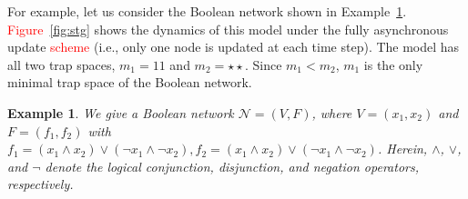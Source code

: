 \documentclass[preprint,12pt]{elsarticle}
\newtheorem{example}{Example}[section]
\newcommand{\change}[1]{\textcolor{red}{#1}}
\begin{document}
For example, let us consider the Boolean network shown in Example~\ref{example:BN}.
\change{Figure~\ref{fig:stg}} shows the dynamics of this model under the fully asynchronous update \change{scheme} (i.e., only one node is updated at each time step).
The model has all two trap spaces, \(m_1 = 11\) and \(m_2 = \star\star\).
Since \(m_1 < m_2\), \(m_1\) is the only minimal trap space of the Boolean network.

\begin{example}
We give a Boolean network \(\mathcal{N} = (V, F)\), where \(V = (x_1, x_2)\) and \(F = (f_1, f_2)\) with \(f_1 = (x_1 \land x_2) \lor (\neg x_1 \land \neg x_2), f_2 = (x_1 \land x_2) \lor (\neg x_1 \land \neg x_2)\). Herein, \(\land\), \(\lor\), and \(\neg\) denote the logical conjunction, disjunction, and negation operators, respectively.\label{example:BN}
\end{example}
\end{document}
